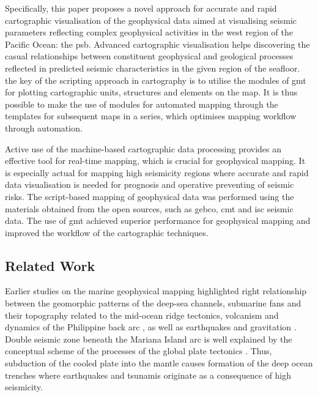 \documentclass{rrparticle}
\begin{document}
Specifically, this paper proposes a novel approach for accurate and rapid cartographic visualisation of the geophysical data aimed at visualising seismic parameters reflecting complex geophysical activities in the west region of the Pacific Ocean: the \ac{psb}. Advanced cartographic visualisation helps discovering the casual relationships between constituent geophysical and geological processes reflected in predicted seismic characteristics in the given region of the seafloor. the key of the scripting approach in cartography is to utilise the modules of \ac{gmt} for plotting cartographic units, structures and elements on the map. It is thus possible to make the use of modules for automated mapping through the templates for subsequent maps in a series, which optimises mapping workflow through automation. 

Active use of the machine-based cartographic data processing provides an effective tool for real-time mapping, which is crucial for geophysical mapping. It is especially actual for mapping high seismicity regions where accurate and rapid data visualisation is needed for prognosis and operative preventing of seismic risks. The script-based mapping of geophysical data was performed using the materials obtained from the open sources, such as \ac{gebco}, \ac{cmt} and \ac{isc} seismic data. The use of \ac{gmt} achieved superior performance for geophysical mapping and improved the workflow of the cartographic techniques. 

\subsection{Related Work}

Earlier studies on the marine geophysical mapping highlighted right relationship between the geomorphic patterns of the deep-sea channels, submarine fans and their topography related to the mid-ocean ridge tectonics, volcanism and dynamics of the Philippine back arc \cite{Menard,Chang,Fujioka1999,Lemenkova2019b,Hall1995b}, as well as earthquakes and gravitation \cite{LinLo}. Double seismic zone beneath the Mariana Island arc is well explained by the conceptual scheme of the processes of the global plate tectonics \cite{Samowitz}. Thus, subduction of the cooled plate into the mantle causes formation of the deep ocean trenches where earthquakes and tsunamis originate as a consequence of high seismicity. 
\end{document}

